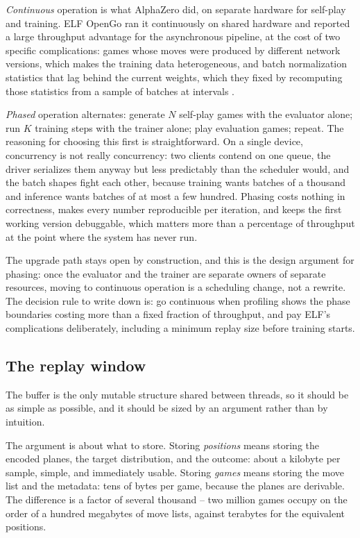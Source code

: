 \emph{Continuous} operation is what AlphaZero did, on separate hardware for
self-play and training. ELF OpenGo ran it continuously on shared hardware and
reported a large throughput advantage for the asynchronous pipeline, at the cost
of two specific complications: games whose moves were produced by different
network versions, which makes the training data heterogeneous, and batch
normalization statistics that lag behind the current weights, which they fixed by
recomputing those statistics from a sample of batches at intervals
\citep{tian2019elf,ioffe2015batchnorm}.

\emph{Phased} operation alternates: generate $N$ self-play games with the
evaluator alone; run $K$ training steps with the trainer alone; play evaluation
games; repeat. The reasoning for choosing this first is straightforward. On a
single device, concurrency is not really concurrency: two clients contend on one
queue, the driver serializes them anyway but less predictably than the scheduler
would, and the batch shapes fight each other, because training wants batches of
a thousand and inference wants batches of at most a few hundred. Phasing costs
nothing in correctness, makes every number reproducible per iteration, and keeps
the first working version debuggable, which matters more than a percentage of
throughput at the point where the system has never run.

The upgrade path stays open by construction, and this is the design argument for
phasing: once the evaluator and the trainer are separate owners of separate
resources, moving to continuous operation is a scheduling change, not a rewrite.
The decision rule to write down is: go continuous when profiling shows the phase
boundaries costing more than a fixed fraction of throughput, and pay ELF's
complications deliberately, including a minimum replay size before training
starts.

\subsection{The replay window}
\label{sec:buffer}

The buffer is the only mutable structure shared between threads, so it should be
as simple as possible, and it should be sized by an argument rather than by
intuition.

The argument is about what to store. Storing \emph{positions} means storing the
encoded planes, the target distribution, and the outcome: about a kilobyte per
sample, simple, and immediately usable. Storing \emph{games} means storing the
move list and the metadata: tens of bytes per game, because the planes are
derivable. The difference is a factor of several thousand -- two million games
occupy on the order of a hundred megabytes of move lists, against terabytes for
the equivalent positions.


